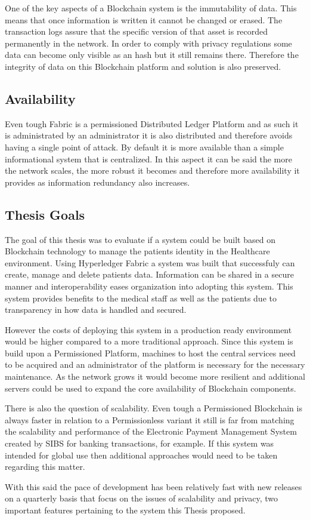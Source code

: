 One of the key aspects of a Blockchain system is the immutability of data. This
means that once information is written it cannot be changed or erased. The
transaction logs assure that the specific version of that asset is recorded
permanently in the network. In order to comply with privacy regulations some
data can become only visible as an hash but it still remains there. Therefore
the integrity of data on this Blockchain platform and solution is also
preserved.

\subsection{Availability}

Even tough Fabric is a permissioned Distributed Ledger Platform and as such it
is administrated by an administrator it is also distributed and therefore
avoids having a single point of attack. By default it is more available than a
simple informational system that is centralized. In this aspect it can be said
the more the network scales, the more robust it becomes and therefore more
availability it provides as information redundancy also increases.

\subsection{Thesis Goals}

The goal of this thesis was to evaluate if a system could be built based on
Blockchain technology to manage the patients identity in the Healthcare
environment. Using Hyperledger Fabric a system was built that successfuly can
create, manage and delete patients data. Information can be shared in a secure
manner and interoperability eases organization into adopting this system. This
system provides benefits to the medical staff as well as the patients due to
transparency in how data is handled and secured.

However the costs of deploying this system in a production ready environment
would be higher compared to a more traditional approach. Since this system is
build upon a Permissioned Platform, machines to host the central services need
to be acquired and an administrator of the platform is necessary for the
necessary maintenance. As the network grows it would become more resilient and
additional servers could be used to expand the core availability of Blockchain
components.

There is also the question of scalability. Even tough a Permissioned Blockchain
is always faster in relation to a Permissionless variant it still is far from
matching the scalability and performance of the Electronic Payment Management
System created by SIBS for banking transactions, for example. If this system
was intended for global use then additional approaches would need to be taken
regarding this matter.

With this said the pace of development has been relatively fast with new
releases on a quarterly basis that focus on the issues of scalability and
privacy, two important features pertaining to the system this Thesis proposed.
